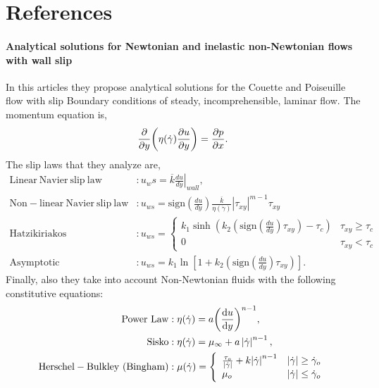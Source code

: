 \documentclass[main.tex]{subfiles}
\begin{document}
\section{References}


\paragraph{Analytical solutions for Newtonian and inelastic non-Newtonian flows with wall slip }\cite{ferrasAnalyticalSolutionsNewtonian2012}
In this articles they propose analytical solutions for the Couette and Poiseuille flow with slip Boundary conditions of steady, incomprehensible, laminar flow.
The momentum equation is,
\begin{gather*}
	\pdv{y}\qty(\eta\qty(\dot\gamma)\pdv{u}{y}) = \pdv{p}{x}.
\end{gather*}
The slip laws that they analyze are, 
\begin{align*}
	\mathrm{Linear~Navier~slip~law} &: u_ws = \overline k\left.\frac{du}{dy}\right|_{wall}, \\
	\mathrm{Non-linear~Navier~slip~law} &:  u_{ws} = \mathrm{sign}\left(\frac{du}{dy}\right)\frac{\overline k}{\eta(\dot\gamma)}\left|\tau_{xy}\right|^{m-1}\tau_{xy} \\
	\mathrm{Hatzikiriakos} &: u_{ws} = \left\{ 
	\begin{array}{ll}
		k_1\sinh\left(k_2\left(\mathrm{sign}\left(\frac{du}{dy}\right)\tau_{xy}\right)-\tau_{c}\right) & \tau_{xy}\geq\tau_{c} \\
		0 & \tau_{xy}<\tau_{c}
	\end{array}
	\right. \\
	\mathrm{Asymptotic} &: u_{ws} = k_1\ln\left[ 1+k_2\left(\mathrm{sign}\left(\frac{du}{dy}\right)\tau_{xy}\right) \right].
\end{align*}
Finally, also they take into account Non-Newtonian fluids with the following constitutive equations:
\begin{align*}
	\mathrm{Power~Law} &: \eta\qty(\dot\gamma) = a\qty(\dv{u}{y})^{n-1}, \\
	\mathrm{Sisko} &: \eta(\dot{\gamma}) = \mu_{\infty} + a\left|\dot{\gamma}\right|^{n-1}, \\
	\mathrm{Herschel-Bulkley~(Bingham)} &: \mu\qty(\dot\gamma) = \left\{
	\begin{array}{ll}
		\frac{\tau_o}{\abs{\dot\gamma}}+k\abs{\dot\gamma}^{n-1} & \abs{\dot\gamma}\geq\dot\gamma_o\\
		\mu_o & \abs{\dot\gamma}\leq\dot\gamma_o
	\end{array}
	\right.
\end{align*}
\end{document}
